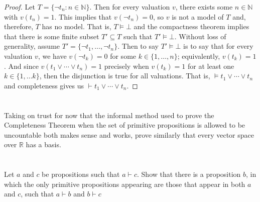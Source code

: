 \documentclass[12pt]{article}
\newenvironment{problem}
    {\begin{lrbox}{\mybox}\begin{minipage}{0.98\textwidth}}
    {\end{minipage}\end{lrbox}\begin{center}\framebox[\textwidth]{\usebox{\mybox}}\end{center}}
\newcommand{\N}{\mathbb{N}}
\newcommand{\R}{\mathbb{R}}
\renewcommand{\models}{\vDash}
\newcommand{\proves}{\vdash}
\begin{document}
\begin{proof}
    Let $T = \{\lnot t_n : n \in \N\}$. Then for every valuation $v$, there exists some $n \in \N$ with $v(t_n) = 1$. This implies that $v(\lnot t_n) = 0$, so $v$ is not a model of $T$ and, therefore, $T$ has no model. That is, $T \models \bot$ and the compactness theorem implies that there is some finite subset $T' \subseteq T$ such that $T' \models \bot$. Without loss of generality, assume $T' = \{\lnot t_1, \dots, \lnot t_n\}$. Then to say $T' \models \bot$ is to say that for every valuation $v$, we have $v(\lnot t_k) = 0$ for some $k \in \{1, \dots, n\}$; equivalently, $v(t_k) = 1$. And since $v(t_1 \lor \cdots \lor t_n) = 1$ precisely when $v(t_k) = 1$ for at least one $k \in \{1, \dots k\}$, then the disjunction is true for all valuations. That is, $\models t_1 \lor \cdots \lor t_n$ and  completeness gives us $\proves t_1 \lor \cdots \lor t_n$.
    
\end{proof}

\section{}
\begin{problem}
    Taking on trust for now that the informal method used to prove the Completeness Theorem when the set of primitive propositions is allowed to be uncountable both makes sense and works, prove similarly that every vector space over $\R$ has a basis.
\end{problem}

\newpage
\section{}
\begin{problem}
    Let $a$ and $c$ be propositions such that $a \proves c$. Show that there is a proposition $b$, in which the only primitive propositions appearing are those that appear in both $a$ and $c$, such that $a \proves b$ and $b \proves c$
\end{problem}
\end{document}
